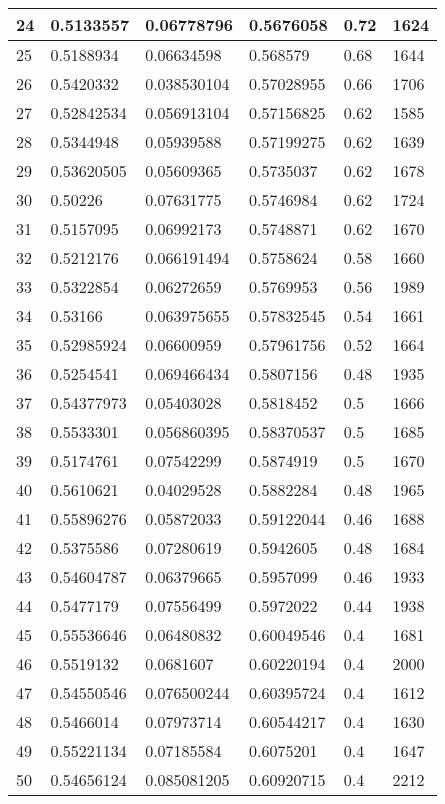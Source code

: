 \begin{longtable}{|l|l|l|l|l|l|}
24 & 0.5133557 & 0.06778796 & 0.5676058 & 0.72 & 1624 \\ \hline 
25 & 0.5188934 & 0.06634598 & 0.568579 & 0.68 & 1644 \\ \hline 
26 & 0.5420332 & 0.038530104 & 0.57028955 & 0.66 & 1706 \\ \hline 
27 & 0.52842534 & 0.056913104 & 0.57156825 & 0.62 & 1585 \\ \hline 
28 & 0.5344948 & 0.05939588 & 0.57199275 & 0.62 & 1639 \\ \hline 
29 & 0.53620505 & 0.05609365 & 0.5735037 & 0.62 & 1678 \\ \hline 
30 & 0.50226 & 0.07631775 & 0.5746984 & 0.62 & 1724 \\ \hline 
31 & 0.5157095 & 0.06992173 & 0.5748871 & 0.62 & 1670 \\ \hline 
32 & 0.5212176 & 0.066191494 & 0.5758624 & 0.58 & 1660 \\ \hline 
33 & 0.5322854 & 0.06272659 & 0.5769953 & 0.56 & 1989 \\ \hline 
34 & 0.53166 & 0.063975655 & 0.57832545 & 0.54 & 1661 \\ \hline 
35 & 0.52985924 & 0.06600959 & 0.57961756 & 0.52 & 1664 \\ \hline 
36 & 0.5254541 & 0.069466434 & 0.5807156 & 0.48 & 1935 \\ \hline 
37 & 0.54377973 & 0.05403028 & 0.5818452 & 0.5 & 1666 \\ \hline 
38 & 0.5533301 & 0.056860395 & 0.58370537 & 0.5 & 1685 \\ \hline 
39 & 0.5174761 & 0.07542299 & 0.5874919 & 0.5 & 1670 \\ \hline 
40 & 0.5610621 & 0.04029528 & 0.5882284 & 0.48 & 1965 \\ \hline 
41 & 0.55896276 & 0.05872033 & 0.59122044 & 0.46 & 1688 \\ \hline 
42 & 0.5375586 & 0.07280619 & 0.5942605 & 0.48 & 1684 \\ \hline 
43 & 0.54604787 & 0.06379665 & 0.5957099 & 0.46 & 1933 \\ \hline 
44 & 0.5477179 & 0.07556499 & 0.5972022 & 0.44 & 1938 \\ \hline 
45 & 0.55536646 & 0.06480832 & 0.60049546 & 0.4 & 1681 \\ \hline 
46 & 0.5519132 & 0.0681607 & 0.60220194 & 0.4 & 2000 \\ \hline 
47 & 0.54550546 & 0.076500244 & 0.60395724 & 0.4 & 1612 \\ \hline 
48 & 0.5466014 & 0.07973714 & 0.60544217 & 0.4 & 1630 \\ \hline 
49 & 0.55221134 & 0.07185584 & 0.6075201 & 0.4 & 1647 \\ \hline 
50 & 0.54656124 & 0.085081205 & 0.60920715 & 0.4 & 2212 \\ \hline 
\end{longtable}